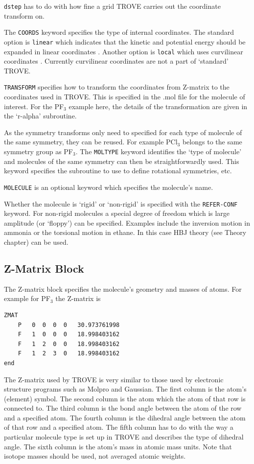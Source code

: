 \verb|dstep| has to do with how fine a grid TROVE carries out the coordinate transform on.

The \verb|COORDS| keyword specifies the type of internal coordinates. The standard option is \verb|linear| which indicates 
that the kinetic and potential energy should be expanded in linear coordinates \cite{TROVE}. 
Another option is \verb|local| which 
uses curvilinear coordinates \cite{15YaYuxx.method}. Currently curvilinear coordinates are not a part of `standard' TROVE. 

\verb|TRANSFORM| specifies how to transform the coordinates from Z-matrix to the coordinates used in TROVE.
This is specified in the .mol file for the molecule of interest.
For the PF$_3$ example here, the details of the transformation are given in the `r-alpha' subroutine.

As the symmetry transforms only need to specified for each type of molecule of the same symmetry, they can be reused. 
For example PCl$_3$ belongs to the same symmetry
group as PF$_3$. The \verb|MOLTYPE| keyword identifies the `type of molecule' and molecules of the same symmetry can 
then be straightforwardly used. This keyword specifies the subroutine to use to define rotational symmetries, etc.

\verb|MOLECULE| is an optional keyword which specifies the molecule's name.

Whether the molecule is `rigid' or `non-rigid' is specified with the \verb|REFER-CONF| keyword. For non-rigid molecules
a special degree of freedom which is large amplitude (or `floppy') can be specified. Examples include the inversion
motion in ammonia or the torsional motion in ethane. In this case HBJ theory (see Theory chapter) can be used.




\subsection{Z-Matrix Block}
The Z-matrix block specifies the molecule's geometry and masses of atoms. For example for PF$_3$ the Z-matrix is
\begin{verbatim}
ZMAT
    P   0  0  0  0   30.973761998
    F   1  0  0  0   18.998403162
    F   1  2  0  0   18.998403162
    F   1  2  3  0   18.998403162
end
\end{verbatim}
The Z-matrix used by TROVE is very similar to those used by electronic structure programs such as Molpro 
and Gaussian.\cite{06Jensen.book}
The first column is the atom's (element) symbol. The second column is the atom which the atom of that row is connected to. 
The third column is the bond angle between the atom of the row and a specified atom. The fourth column is the dihedral angle 
between the atom of that row and a specified atom. The fifth column has to do with the way a particular molecule type is
set up in TROVE and describes the type of dihedral angle. The sixth column is the atom's mass in atomic mass units. 
Note that isotope masses should be used, not averaged atomic weights. 


